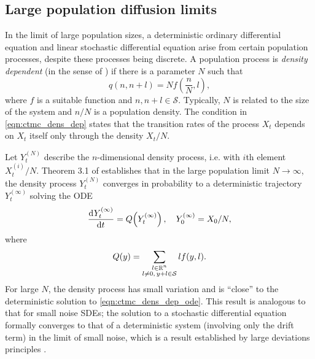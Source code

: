 \subsection{Large population diffusion limits}\label{sec:epi_limits}
In the limit of large population sizes, a deterministic ordinary differential equation and linear stochastic differential equation arise from certain population processes, despite these processes being discrete.
A population process is \emph{density dependent} (in the sense of \citet{Kurtz_1970_SolutionsOrdinaryDifferential}) if there is a parameter \(N\) such that
\begin{equation}
	q\!\left(n, n+l\right) = Nf\!\left(\frac{n}{N}, l\right),
	\label{eqn:ctmc_dens_dep}
\end{equation}
where \(f\) is a suitable function and \(n, n+l \in \mathcal{S}\).
Typically, \(N\) is related to the size of the system and \(n / N\) is a population density.
The condition in \cref{eqn:ctmc_dens_dep} states that the transition rates of the process \(X_t\) depends on \(X_t\) itself only through the density \(X_t / N\).

Let \(Y_t^{(N)}\) describe the \(n\)-dimensional density process, i.e. with \(i\)th element \(X_t^{(i)} / N\).
Theorem 3.1 of \citet{Kurtz_1970_SolutionsOrdinaryDifferential} establishes that in the large population limit \(N \to \infty\), the density process \(Y_t^{(N)}\) converges in probability to a deterministic trajectory \(Y_t^{(\infty)}\) solving the ODE
\begin{equation}
	\dod{Y_t^{(\infty)}}{t} = Q\!\left(Y_t^{(\infty)}\right), \quad Y_0^{(\infty)} = X_0 / N,
	\label{eqn:ctmc_dens_dep_ode}
\end{equation}
where
\[
	Q\!\left(y\right) = \sum_{\substack{l \in \mathbb{R}^n \\ l \neq 0,\, y + l \in \mathcal{S}}}{l f\!\left(y, l\right)}.
\]
For large \(N\), the density process has small variation and is ``close'' to the deterministic solution to \cref{eqn:ctmc_dens_dep_ode}.
This result is analogous to that for small noise SDEs; the solution to a stochastic differential equation formally converges to that of a deterministic system (involving only the drift term) in the limit of small noise, which is a result established by large deviations principles \citep[e.g]{FreidlinWentzell_1998_RandomPerturbationsDynamical}.

